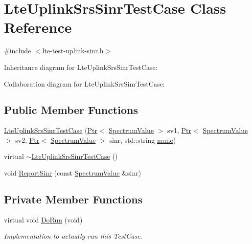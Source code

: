 \hypertarget{classLteUplinkSrsSinrTestCase}{}\section{Lte\+Uplink\+Srs\+Sinr\+Test\+Case Class Reference}
\label{classLteUplinkSrsSinrTestCase}


{\ttfamily \#include $<$lte-\/test-\/uplink-\/sinr.\+h$>$}



Inheritance diagram for Lte\+Uplink\+Srs\+Sinr\+Test\+Case\+:


Collaboration diagram for Lte\+Uplink\+Srs\+Sinr\+Test\+Case\+:
\subsection*{Public Member Functions}
\begin{DoxyCompactItemize}
\item 
\hyperlink{classLteUplinkSrsSinrTestCase_abf6483b53f51f9ec6f888d528626cf0c}{Lte\+Uplink\+Srs\+Sinr\+Test\+Case} (\hyperlink{classns3_1_1Ptr}{Ptr}$<$ \hyperlink{classns3_1_1SpectrumValue}{Spectrum\+Value} $>$ sv1, \hyperlink{classns3_1_1Ptr}{Ptr}$<$ \hyperlink{classns3_1_1SpectrumValue}{Spectrum\+Value} $>$ sv2, \hyperlink{classns3_1_1Ptr}{Ptr}$<$ \hyperlink{classns3_1_1SpectrumValue}{Spectrum\+Value} $>$ sinr, std\+::string \hyperlink{generate__test__data__lte__spectrum__model_8m_ab74e6bf80237ddc4109968cedc58c151}{name})
\item 
virtual \hyperlink{classLteUplinkSrsSinrTestCase_a66c769c6a26b181d6f1fb690ac13b9c6}{$\sim$\+Lte\+Uplink\+Srs\+Sinr\+Test\+Case} ()
\item 
void \hyperlink{classLteUplinkSrsSinrTestCase_a18b2dde96beaf833a2af98219b8a57e8}{Report\+Sinr} (const \hyperlink{classns3_1_1SpectrumValue}{Spectrum\+Value} \&sinr)
\end{DoxyCompactItemize}
\subsection*{Private Member Functions}
\begin{DoxyCompactItemize}
\item 
virtual void \hyperlink{classLteUplinkSrsSinrTestCase_ac90eb5af9e01adde2baae7a9e98941d8}{Do\+Run} (void)
\begin{DoxyCompactList}\small\item\em Implementation to actually run this Test\+Case. \end{DoxyCompactList}\end{DoxyCompactItemize}

